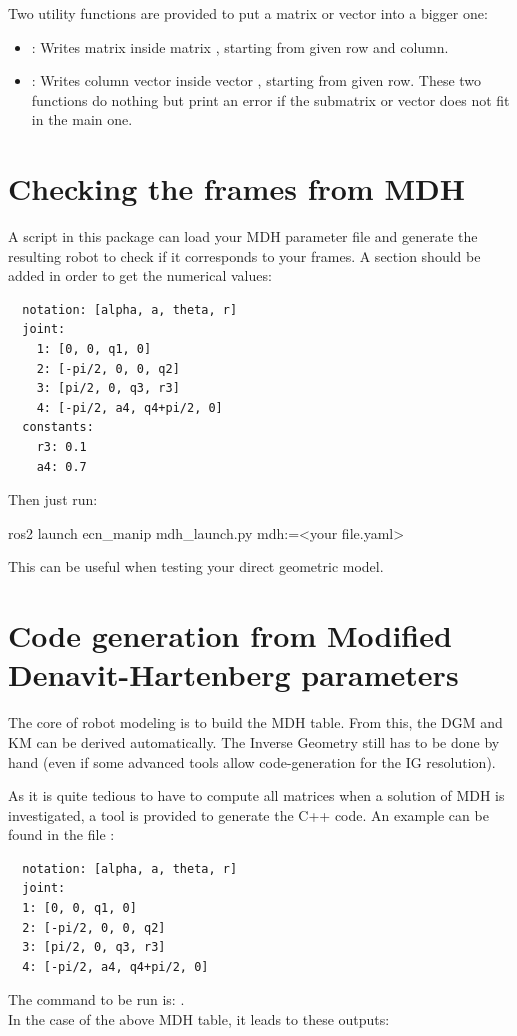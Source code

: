 \documentclass{ecnreport}
\begin{document}
  Two utility functions are provided to put a matrix or vector into a bigger one:
  \begin{itemize}
    \item {}: Writes matrix  inside matrix , starting from given row and column.
    \item {}: Writes column vector  inside vector , starting from given row. These two functions do nothing but print an error
    if the submatrix or vector does not fit in the main one.
  \end{itemize}
  
  
  \newpage

   \section{Checking the frames from MDH}\label{dhframes}

   A script in this package can load your MDH parameter file and generate the resulting robot to check if it corresponds to your frames.
   A section  should be added in order to get the numerical values:

  \cppstyle
  \begin{lstlisting}
  notation: [alpha, a, theta, r]
  joint:
    1: [0, 0, q1, 0]
    2: [-pi/2, 0, 0, q2]
    3: [pi/2, 0, q3, r3]
    4: [-pi/2, a4, q4+pi/2, 0]
  constants:
    r3: 0.1
    a4: 0.7
  \end{lstlisting}

  Then just run:
  \begin{bashcode}
   ros2 launch ecn_manip mdh_launch.py mdh:=<your file.yaml>
  \end{bashcode}


  This can be useful when testing your direct geometric model.



  \section{Code generation from Modified Denavit-Hartenberg parameters}\label{dhcode}

  The core of robot modeling is to build the MDH table. From this, the DGM and KM can be derived automatically. The Inverse Geometry still has to be done by hand (even if some advanced tools allow code-generation for the IG resolution).

  As it is quite tedious to have to compute all matrices when a solution of MDH is investigated, a tool is provided to generate the C++ code. An example can be found in the file :
  \cppstyle
  \begin{lstlisting}
  notation: [alpha, a, theta, r]
  joint:
  1: [0, 0, q1, 0]
  2: [-pi/2, 0, 0, q2]
  3: [pi/2, 0, q3, r3]
  4: [-pi/2, a4, q4+pi/2, 0]
  \end{lstlisting}
  The command to be run is: .\\
  In the case of the above MDH table, it leads to these outputs:
\end{document}
